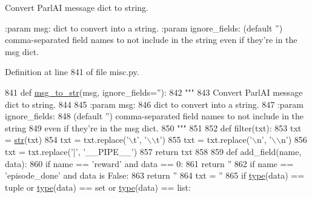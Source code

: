 \begin{DoxyVerb}Convert ParlAI message dict to string.

:param msg:
    dict to convert into a string.
:param ignore_fields:
    (default '') comma-separated field names to not include in the string
    even if they're in the msg dict.
\end{DoxyVerb}
 

Definition at line 841 of file misc.\+py.


\begin{DoxyCode}
841 \textcolor{keyword}{def }\hyperlink{namespaceparlai_1_1utils_1_1misc_ae5db473b41d3b49814e2566e866282b6}{msg\_to\_str}(msg, ignore\_fields=''):
842     \textcolor{stringliteral}{"""}
843 \textcolor{stringliteral}{    Convert ParlAI message dict to string.}
844 \textcolor{stringliteral}{}
845 \textcolor{stringliteral}{    :param msg:}
846 \textcolor{stringliteral}{        dict to convert into a string.}
847 \textcolor{stringliteral}{    :param ignore\_fields:}
848 \textcolor{stringliteral}{        (default '') comma-separated field names to not include in the string}
849 \textcolor{stringliteral}{        even if they're in the msg dict.}
850 \textcolor{stringliteral}{    """}
851 
852     \textcolor{keyword}{def }filter(txt):
853         txt = \hyperlink{namespacegenerate__task__READMEs_a5b88452ffb87b78c8c85ececebafc09f}{str}(txt)
854         txt = txt.replace(\textcolor{stringliteral}{'\(\backslash\)t'}, \textcolor{stringliteral}{'\(\backslash\)\(\backslash\)t'})
855         txt = txt.replace(\textcolor{stringliteral}{'\(\backslash\)n'}, \textcolor{stringliteral}{'\(\backslash\)\(\backslash\)n'})
856         txt = txt.replace(\textcolor{stringliteral}{'|'}, \textcolor{stringliteral}{'\_\_PIPE\_\_'})
857         \textcolor{keywordflow}{return} txt
858 
859     \textcolor{keyword}{def }add\_field(name, data):
860         \textcolor{keywordflow}{if} name == \textcolor{stringliteral}{'reward'} \textcolor{keywordflow}{and} data == 0:
861             \textcolor{keywordflow}{return} \textcolor{stringliteral}{''}
862         \textcolor{keywordflow}{if} name == \textcolor{stringliteral}{'episode\_done'} \textcolor{keywordflow}{and} data \textcolor{keywordflow}{is} \textcolor{keyword}{False}:
863             \textcolor{keywordflow}{return} \textcolor{stringliteral}{''}
864         txt = \textcolor{stringliteral}{''}
865         \textcolor{keywordflow}{if} \hyperlink{namespaceparlai_1_1agents_1_1tfidf__retriever_1_1build__tfidf_ad5dfae268e23f506da084a9efb72f619}{type}(data) == tuple \textcolor{keywordflow}{or} \hyperlink{namespaceparlai_1_1agents_1_1tfidf__retriever_1_1build__tfidf_ad5dfae268e23f506da084a9efb72f619}{type}(data) == set \textcolor{keywordflow}{or} \hyperlink{namespaceparlai_1_1agents_1_1tfidf__retriever_1_1build__tfidf_ad5dfae268e23f506da084a9efb72f619}{type}(data) == list:

\end{DoxyCode}
